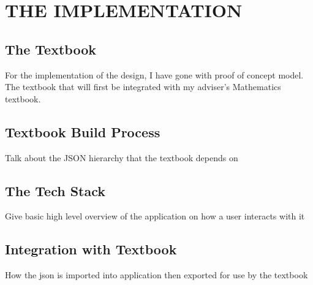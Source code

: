 %
%
%
%

\chapter{THE IMPLEMENTATION}

\section{The Textbook}

For the implementation of the design, I have gone with proof of concept model. The textbook that will first be integrated with my adviser's Mathematics textbook.

\section{Textbook Build Process}

Talk about the JSON hierarchy that the textbook depends on

\section{The Tech Stack}

Give basic high level overview of the application on how a user interacts with it

\section{Integration with Textbook}

How the json is imported into application then exported for use by the textbook

